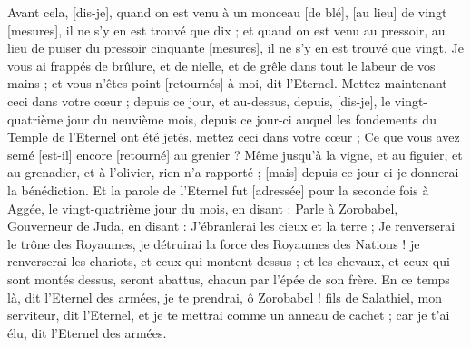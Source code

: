 \begin{multicols}{2}
Avant cela, [dis-je], quand on est venu à un monceau [de blé], [au lieu] de vingt [mesures], il ne s'y en est trouvé que dix ; et quand on est venu au pressoir, au lieu de puiser du pressoir cinquante [mesures], il ne s'y en est trouvé que vingt.
Je vous ai frappés de brûlure, et de nielle, et de grêle dans tout le labeur de vos mains ; et vous n'êtes point [retournés] à moi, dit l'Eternel.
Mettez maintenant ceci dans votre cœur ; depuis ce jour, et au-dessus, depuis, [dis-je], le vingt-quatrième jour du neuvième mois, depuis ce jour-ci auquel les fondements du Temple de l'Eternel ont été jetés, mettez ceci dans votre cœur ;
Ce que vous avez semé [est-il] encore [retourné] au grenier ? Même jusqu'à la vigne, et au figuier, et au grenadier, et à l'olivier, rien n'a rapporté ; [mais] depuis ce jour-ci je donnerai la bénédiction.
Et la parole de l'Eternel fut [adressée] pour la seconde fois à Aggée, le vingt-quatrième jour du mois, en disant :
Parle à Zorobabel, Gouverneur de Juda, en disant : J'ébranlerai les cieux et la terre ;
Je renverserai le trône des Royaumes, je détruirai la force des Royaumes des Nations ! je renverserai les chariots, et ceux qui montent dessus ; et les chevaux, et ceux qui sont montés dessus, seront abattus, chacun par l'épée de son frère.
En ce temps là, dit l'Eternel des armées, je te prendrai, ô Zorobabel ! fils de Salathiel, mon serviteur, dit l'Eternel, et je te mettrai comme un anneau de cachet ; car je t'ai élu, dit l'Eternel des armées.
\PPE{}
\end{multicols}
